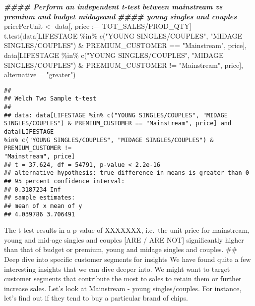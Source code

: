 \documentclass[
]{article}
\newenvironment{Shaded}{\begin{snugshade}}{\end{snugshade}}
\newcommand{\AttributeTok}[1]{\textcolor[rgb]{0.77,0.63,0.00}{#1}}
\newcommand{\DocumentationTok}[1]{\textcolor[rgb]{0.56,0.35,0.01}{\textbf{\textit{#1}}}}
\newcommand{\ErrorTok}[1]{\textcolor[rgb]{0.64,0.00,0.00}{\textbf{#1}}}
\newcommand{\FunctionTok}[1]{\textcolor[rgb]{0.00,0.00,0.00}{#1}}
\newcommand{\NormalTok}[1]{#1}
\newcommand{\OtherTok}[1]{\textcolor[rgb]{0.56,0.35,0.01}{#1}}
\newcommand{\SpecialCharTok}[1]{\textcolor[rgb]{0.00,0.00,0.00}{#1}}
\newcommand{\StringTok}[1]{\textcolor[rgb]{0.31,0.60,0.02}{#1}}
\begin{document}
\begin{Shaded}
\begin{Highlighting}[]
\DocumentationTok{\#\#\#\# Perform an independent t{-}test between mainstream vs premium and budget midageand}
\DocumentationTok{\#\#\#\# young singles and couples}
\NormalTok{pricePerUnit }\OtherTok{\textless{}{-}}\NormalTok{ data[, price }\SpecialCharTok{:}\ErrorTok{=}\NormalTok{ TOT\_SALES}\SpecialCharTok{/}\NormalTok{PROD\_QTY]}
\FunctionTok{t.test}\NormalTok{(data[LIFESTAGE }\SpecialCharTok{\%in\%} \FunctionTok{c}\NormalTok{(}\StringTok{"YOUNG SINGLES/COUPLES"}\NormalTok{, }\StringTok{"MIDAGE SINGLES/COUPLES"}\NormalTok{) }\SpecialCharTok{\&}\NormalTok{ PREMIUM\_CUSTOMER }\SpecialCharTok{==} \StringTok{"Mainstream"}\NormalTok{, price], data[LIFESTAGE }\SpecialCharTok{\%in\%} \FunctionTok{c}\NormalTok{(}\StringTok{"YOUNG SINGLES/COUPLES"}\NormalTok{, }\StringTok{"MIDAGE SINGLES/COUPLES"}\NormalTok{) }\SpecialCharTok{\&}\NormalTok{ PREMIUM\_CUSTOMER }\SpecialCharTok{!=} \StringTok{"Mainstream"}\NormalTok{, price], }\AttributeTok{alternative =} \StringTok{"greater"}\NormalTok{)}
\end{Highlighting}
\end{Shaded}

\begin{verbatim}
##
## Welch Two Sample t-test
##
## data: data[LIFESTAGE %in% c("YOUNG SINGLES/COUPLES", "MIDAGE
SINGLES/COUPLES") & PREMIUM_CUSTOMER == "Mainstream", price] and data[LIFESTAGE
%in% c("YOUNG SINGLES/COUPLES", "MIDAGE SINGLES/COUPLES") & PREMIUM_CUSTOMER !=
"Mainstream", price]
## t = 37.624, df = 54791, p-value < 2.2e-16
## alternative hypothesis: true difference in means is greater than 0
## 95 percent confidence interval:
## 0.3187234 Inf
## sample estimates:
## mean of x mean of y
## 4.039786 3.706491
\end{verbatim}

The t-test results in a p-value of XXXXXXX, i.e.~the unit price for
mainstream, young and mid-age singles and couples {[}ARE / ARE NOT{]}
significantly higher than that of budget or premium, young and midage
singles and couples. \#\# Deep dive into specific customer segments for
insights We have found quite a few interesting insights that we can dive
deeper into. We might want to target customer segments that contribute
the most to sales to retain them or further increase sales. Let's look
at Mainstream - young singles/couples. For instance, let's find out if
they tend to buy a particular brand of chips.
\end{document}
